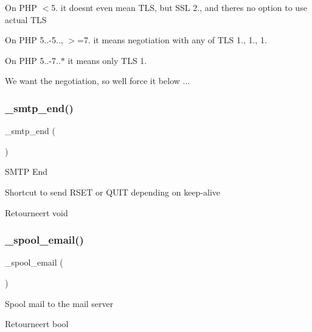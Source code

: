 \begin{DoxyItemize}
\item On P\+HP $<$5. it doesn\textquotesingle{}t even mean T\+LS, but S\+SL 2., and there\textquotesingle{}s no option to use actual T\+LS
\item On P\+HP 5..-\/5.., $>$=7. it means negotiation with any of T\+LS 1., 1., 1.
\item On P\+HP 5..-\/7..$\ast$ it means only T\+LS 1.
\end{DoxyItemize}

We want the negotiation, so we\textquotesingle{}ll force it below ...\mbox{\label{class_c_i___email_a275593e37ea7d04035b5ce80d8934a13}} 
\subsubsection{\texorpdfstring{\_smtp\_end()}{\_smtp\_end()}}
{\footnotesize\ttfamily \+\_\+smtp\+\_\+end (\begin{DoxyParamCaption}{ }\end{DoxyParamCaption})\hspace{0.3cm}{\ttfamily [protected]}}

S\+M\+TP End

Shortcut to send R\+S\+ET or Q\+U\+IT depending on keep-\/alive

\begin{DoxyReturn}{Retourneert}
void 
\end{DoxyReturn}
\mbox{\label{class_c_i___email_a5d45a2f98c27332dfe78086c88eafd3c}} 
\subsubsection{\texorpdfstring{\_spool\_email()}{\_spool\_email()}}
{\footnotesize\ttfamily \+\_\+spool\+\_\+email (\begin{DoxyParamCaption}{ }\end{DoxyParamCaption})\hspace{0.3cm}{\ttfamily [protected]}}

Spool mail to the mail server

\begin{DoxyReturn}{Retourneert}
bool 
\end{DoxyReturn}
\mbox{\label{class_c_i___email_a64cd83e470ede0781d028d7198474d1c}} 
